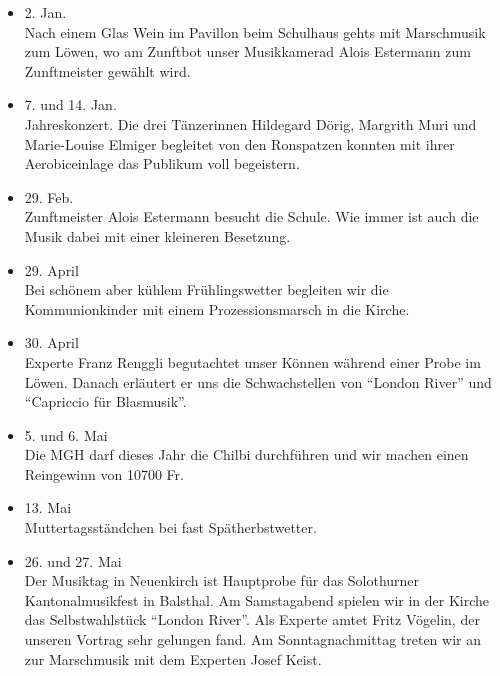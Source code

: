 \begin{multicols}{2}


    \begin{itemize}

        \item[]2. Jan.\\
        Nach einem Glas Wein im Pavillon beim Schulhaus gehts mit Marschmusik
        zum Löwen, wo am Zunftbot unser Musikkamerad Alois Estermann zum
        Zunftmeister gewählt wird.

        \item[]7. und 14. Jan.\\
        Jahreskonzert. Die drei Tänzerinnen Hildegard Dörig, Margrith Muri und
        Marie-Louise Elmiger begleitet von den Ronspatzen konnten mit ihrer
        Aerobiceinlage das Publikum voll begeistern.

        \item[]29. Feb.\\
        Zunftmeister Alois Estermann besucht die Schule. Wie immer ist auch die
        Musik dabei mit einer kleineren Besetzung.

        \item[]29. April\\
        Bei schönem aber kühlem Frühlingswetter begleiten wir die
        Kommunionkinder mit einem Prozessionsmarsch in die Kirche.

        \item[]30. April\\
        Experte Franz Renggli begutachtet unser Können während einer Probe im
        Löwen. Danach erläutert er uns die Schwachstellen von \enquote{London
            River} und \enquote{Capriccio für Blasmusik}.

        \item[]5. und 6. Mai\\
        Die MGH darf dieses Jahr die Chilbi durchführen und wir machen einen
        Reingewinn von 10700 Fr.

        \item[]13. Mai\\
        Muttertagsständchen bei fast Spätherbstwetter.

        \item[]26. und 27. Mai\\
        Der Musiktag in Neuenkirch ist Hauptprobe für das Solothurner
        Kantonalmusikfest in Balsthal. Am Samstagabend spielen wir in der Kirche
        das Selbstwahlstück \enquote{London River}. Als Experte amtet Fritz
        Vögelin, der unseren Vortrag sehr gelungen fand. Am Sonntagnachmittag
        treten wir an zur Marschmusik mit dem Experten Josef Keist.


\end{itemize}
\end{multicols}
